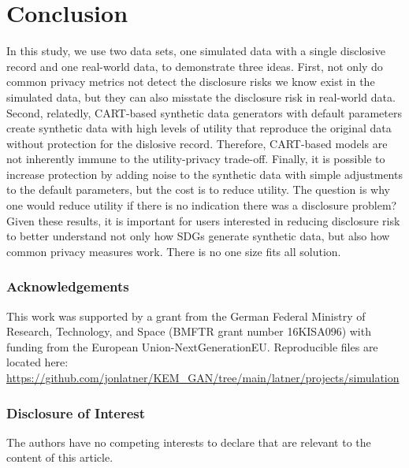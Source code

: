 \documentclass[a4paper,11pt]{style/uneceart}
\begin{document}
\section{Conclusion}

In this study, we use two data sets, one simulated data with a single disclosive record and one real-world data, to demonstrate three ideas.  First, not only do common privacy metrics not detect the disclosure risks we know exist in the simulated data, but they can also misstate the disclosure risk in real-world data.  Second, relatedly, CART-based synthetic data generators with default parameters create synthetic data with high levels of utility that reproduce the original data without protection for the dislosive record.  Therefore, CART-based models are not inherently immune to the utility-privacy trade-off.  Finally, it is possible to increase protection by adding noise to the synthetic data with simple adjustments to the default parameters, but the cost is to reduce utility.  The question is why one would reduce utility if there is no indication there was a disclosure problem?  Given these results, it is important for users interested in reducing disclosure risk to better understand not only how SDGs generate synthetic data, but also how common privacy measures work.  There is no one size fits all solution. 

\subsubsection{Acknowledgements} This work was supported by a grant from the German Federal Ministry of Research, Technology, and Space (BMFTR grant number 16KISA096) with funding from the European Union-NextGenerationEU.  Reproducible files are located here: \url{https://github.com/jonlatner/KEM\_GAN/tree/main/latner/projects/simulation}

\subsubsection{Disclosure of Interest} The authors have no competing interests to declare that are relevant to the content of this article.






\clearpage
\appendix
\end{document}

